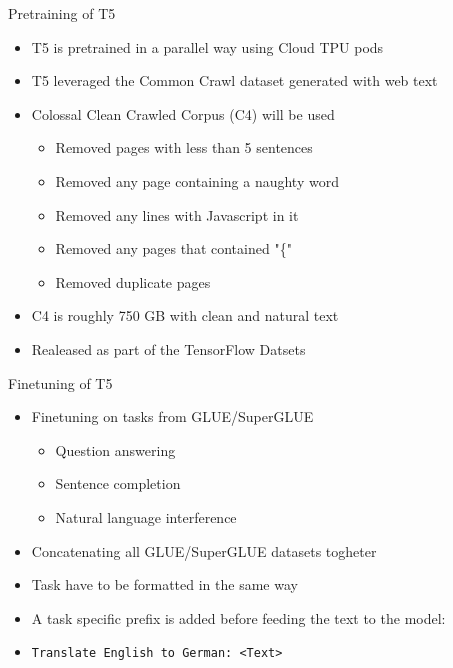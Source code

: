 \documentclass[english]{mlutalk}
\begin{document}
\begin{frame}{Pretraining of T5}
  \begin{itemize}
    \item T5 is pretrained in a parallel way using Cloud TPU pods
    \item T5 leveraged the Common Crawl dataset generated with web text
    \item Colossal Clean Crawled Corpus (C4) will be used
    \begin{itemize}
      \item Removed pages with less than 5 sentences 
      \item Removed any page containing a naughty word 
      \item Removed any lines with Javascript in it
      \item Removed any pages that contained "\{"
      \item Removed duplicate pages
    \end{itemize}
    \item C4 is roughly 750 GB with clean and natural text
    \item Realeased as part of the TensorFlow Datsets
  \end{itemize}
\end{frame}

\begin{frame}{Finetuning of T5}
    \begin{itemize}
      \item Finetuning on tasks from GLUE/SuperGLUE
      \begin{itemize}
        \item Question answering
        \item Sentence completion
        \item Natural language interference
      \end{itemize}
      \item Concatenating all GLUE/SuperGLUE datasets togheter
      \item Task have to be formatted in the same way
      \item A task specific prefix is added before feeding the text to the model:
      \item \texttt{Translate English to German: <Text>}
    \end{itemize}
\end{frame}
\end{document}
